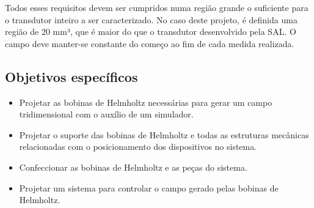 Todos esses requisitos devem ser cumpridos numa região grande o suficiente para o transdutor inteiro a ser caracterizado. No caso deste projeto, é definida uma região de 20 mm³, que é maior do que o transdutor desenvolvido pela SAL. O campo deve manter-se constante do começo ao fim de cada medida realizada.

\subsection{Objetivos específicos}

\begin{itemize}
    \item Projetar as bobinas de Helmholtz necessárias para gerar um campo tridimensional com o auxílio de um simulador.
    \item Projetar o suporte das bobinas de Helmholtz e todas as estruturas mecânicas relacionadas com o posicionamento dos dispositivos no sistema.
    \item Confeccionar as bobinas de Helmholtz e as peças do sistema.
    \item Projetar um sistema para controlar o campo gerado pelas bobinas de Helmholtz.
\end{itemize}
